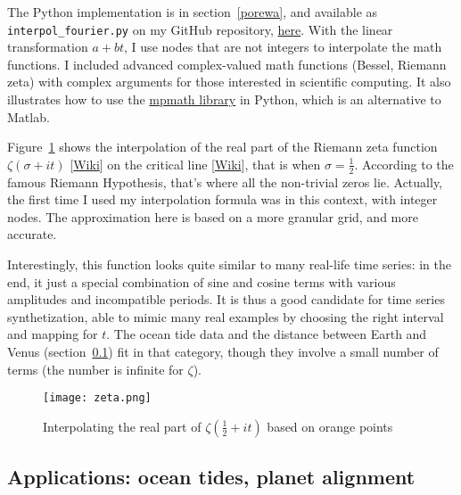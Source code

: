 \documentclass[oneside,10pt]{book}
\begin{document}
The Python implementation is in section~\ref{porewa}, and available as \texttt{interpol\_fourier.py} on my GitHub repository, 
\href{https://github.com/VincentGranville/Statistical-Optimization/blob/main/interpol_fourier.py}{ here}. With the linear transformation $a+bt$, I use nodes that are not integers to interpolate the math functions. I included advanced complex-valued math functions (Bessel, Riemann zeta) with complex arguments for those interested in scientific computing. It also illustrates how to use the 
\href{https://mpmath.org/}{mpmath library} in Python, which is an alternative to Matlab. 

Figure~\ref{fig:zeta} shows the interpolation of the real part of the 
\textcolor{index}{Riemann zeta function}  
 $\zeta(\sigma +it)$ 
[\href{https://en.wikipedia.org/wiki/Riemann_zeta_function}{Wiki}] on the 
 \textcolor{index}{critical line} [\href{https://en.wikipedia.org/wiki/Riemann_hypothesis#Zeros_on_the_critical_line}{Wiki}], that is when $\sigma=\frac{1}{2}$. 
According to the famous \textcolor{index}{Riemann Hypothesis}, that's where all the non-trivial zeros lie.
 Actually, the first time I used my interpolation formula was in this context, with integer nodes. The approximation here is based on a more granular grid, and more accurate.  


Interestingly, this function looks quite similar to many real-life time series: in the end, it just a special combination of sine and cosine terms with various amplitudes and incompatible periods. It is thus a good candidate for time series synthetization, able to mimic many real examples by choosing the right interval and mapping for $t$. The ocean tide data and the distance between Earth and Venus (section~\ref{venus}) fit in that category, though they involve 
 a small number of terms (the number is infinite for $\zeta$).     


\begin{figure}[H]
\centering
\texttt{[image: zeta.png]} %
\caption{Interpolating the real part of $\zeta(\frac{1}{2}+it)$ based on orange points}
\label{fig:zeta}
\end{figure}




\subsection{Applications: ocean tides, planet alignment}\label{venus}
\end{document}
